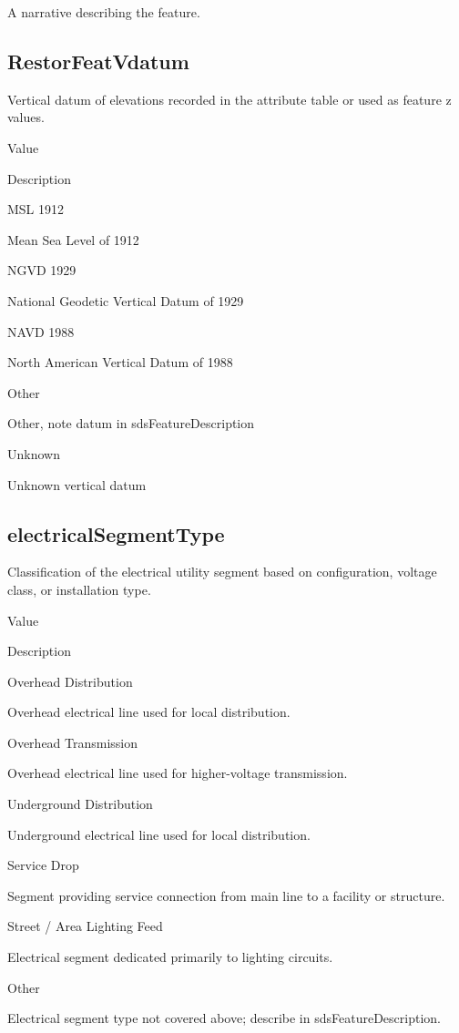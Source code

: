 \documentclass[
  letterpaper,
  DIV=11,
  numbers=noendperiod]{scrreprt}
\begin{document}
A narrative describing the feature.

\subsection{RestorFeatVdatum}\label{restorfeatvdatum-20}

Vertical datum of elevations recorded in the attribute table or used as
feature z values.

Value

Description

MSL 1912

Mean Sea Level of 1912

NGVD 1929

National Geodetic Vertical Datum of 1929

NAVD 1988

North American Vertical Datum of 1988

Other

Other, note datum in sdsFeatureDescription

Unknown

Unknown vertical datum

\subsection{electricalSegmentType}\label{electricalsegmenttype-1}

Classification of the electrical utility segment based on configuration,
voltage class, or installation type.

Value

Description

Overhead Distribution

Overhead electrical line used for local distribution.

Overhead Transmission

Overhead electrical line used for higher-voltage transmission.

Underground Distribution

Underground electrical line used for local distribution.

Service Drop

Segment providing service connection from main line to a facility or
structure.

Street / Area Lighting Feed

Electrical segment dedicated primarily to lighting circuits.

Other

Electrical segment type not covered above; describe in
sdsFeatureDescription.
\end{document}
